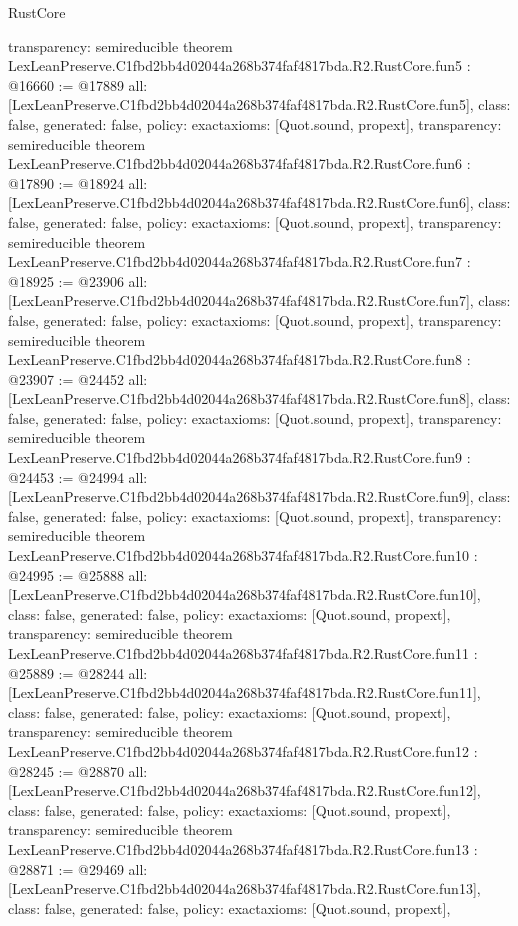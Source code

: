 \begin{lexlean}{RustCore}
\begin{coremodule}
{  transparency: semireducible
}
theorem LexLeanPreserve.C1fbd2bb4d02044a268b374faf4817bda.R2.RustCore.fun5 : @16660 := @17889 {
  all: [LexLeanPreserve.C1fbd2bb4d02044a268b374faf4817bda.R2.RustCore.fun5],
  class: false,
  generated: false,
  policy: exact{axioms: [Quot.sound, propext]},
  transparency: semireducible
}
theorem LexLeanPreserve.C1fbd2bb4d02044a268b374faf4817bda.R2.RustCore.fun6 : @17890 := @18924 {
  all: [LexLeanPreserve.C1fbd2bb4d02044a268b374faf4817bda.R2.RustCore.fun6],
  class: false,
  generated: false,
  policy: exact{axioms: [Quot.sound, propext]},
  transparency: semireducible
}
theorem LexLeanPreserve.C1fbd2bb4d02044a268b374faf4817bda.R2.RustCore.fun7 : @18925 := @23906 {
  all: [LexLeanPreserve.C1fbd2bb4d02044a268b374faf4817bda.R2.RustCore.fun7],
  class: false,
  generated: false,
  policy: exact{axioms: [Quot.sound, propext]},
  transparency: semireducible
}
theorem LexLeanPreserve.C1fbd2bb4d02044a268b374faf4817bda.R2.RustCore.fun8 : @23907 := @24452 {
  all: [LexLeanPreserve.C1fbd2bb4d02044a268b374faf4817bda.R2.RustCore.fun8],
  class: false,
  generated: false,
  policy: exact{axioms: [Quot.sound, propext]},
  transparency: semireducible
}
theorem LexLeanPreserve.C1fbd2bb4d02044a268b374faf4817bda.R2.RustCore.fun9 : @24453 := @24994 {
  all: [LexLeanPreserve.C1fbd2bb4d02044a268b374faf4817bda.R2.RustCore.fun9],
  class: false,
  generated: false,
  policy: exact{axioms: [Quot.sound, propext]},
  transparency: semireducible
}
theorem LexLeanPreserve.C1fbd2bb4d02044a268b374faf4817bda.R2.RustCore.fun10 : @24995 := @25888 {
  all: [LexLeanPreserve.C1fbd2bb4d02044a268b374faf4817bda.R2.RustCore.fun10],
  class: false,
  generated: false,
  policy: exact{axioms: [Quot.sound, propext]},
  transparency: semireducible
}
theorem LexLeanPreserve.C1fbd2bb4d02044a268b374faf4817bda.R2.RustCore.fun11 : @25889 := @28244 {
  all: [LexLeanPreserve.C1fbd2bb4d02044a268b374faf4817bda.R2.RustCore.fun11],
  class: false,
  generated: false,
  policy: exact{axioms: [Quot.sound, propext]},
  transparency: semireducible
}
theorem LexLeanPreserve.C1fbd2bb4d02044a268b374faf4817bda.R2.RustCore.fun12 : @28245 := @28870 {
  all: [LexLeanPreserve.C1fbd2bb4d02044a268b374faf4817bda.R2.RustCore.fun12],
  class: false,
  generated: false,
  policy: exact{axioms: [Quot.sound, propext]},
  transparency: semireducible
}
theorem LexLeanPreserve.C1fbd2bb4d02044a268b374faf4817bda.R2.RustCore.fun13 : @28871 := @29469 {
  all: [LexLeanPreserve.C1fbd2bb4d02044a268b374faf4817bda.R2.RustCore.fun13],
  class: false,
  generated: false,
  policy: exact{axioms: [Quot.sound, propext]},
}
\end{coremodule}
\end{lexlean}
